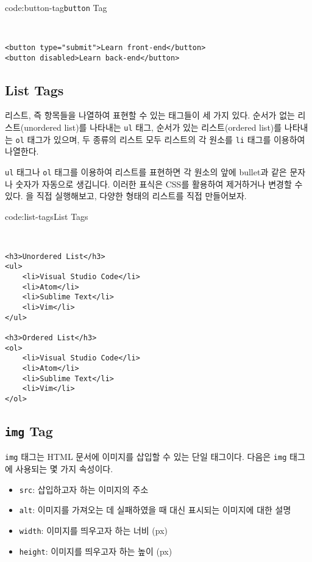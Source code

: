\begin{codeenv}{code:button-tag}{\texttt{button} Tag}\begin{verbatim}


<button type="submit">Learn front-end</button>
<button disabled>Learn back-end</button>
\end{verbatim}
\end{codeenv}

\subsection*{List Tags}
리스트, 즉 항목들을 나열하여 표현할 수 있는 태그들이 세 가지 있다. 순서가 없는 리스트(unordered list)를 나타내는 \verb|ul| 태그, 순서가 있는 리스트(ordered list)를 나타내는 \verb|ol| 태그가 있으며, 두 종류의 리스트 모두 리스트의 각 원소를 \verb|li| 태그를 이용하여 나열한다.

\verb|ul| 태그나 \verb|ol| 태그를 이용하여 리스트를 표현하면 각 원소의 앞에 bullet과 같은 문자나 숫자가 자동으로 생깁니다. 이러한 표식은 CSS를 활용하여 제거하거나 변경할 수 있다. 을 직접 실행해보고, 다양한 형태의 리스트를 직접 만들어보자.

\begin{codeenv}{code:list-tags}{List Tags}\begin{verbatim}


<h3>Unordered List</h3>
<ul>
    <li>Visual Studio Code</li>
    <li>Atom</li>
    <li>Sublime Text</li>
    <li>Vim</li>
</ul>

<h3>Ordered List</h3>
<ol>
    <li>Visual Studio Code</li>
    <li>Atom</li>
    <li>Sublime Text</li>
    <li>Vim</li>
</ol>
\end{verbatim}
\end{codeenv}

\subsection*{\texttt{img} Tag}
\verb|img| 태그는 HTML 문서에 이미지를 삽입할 수 있는 단일 태그이다. 다음은 \verb|img| 태그에 사용되는 몇 가지 속성이다.

\begin{itemize}
    \item \verb|src|: 삽입하고자 하는 이미지의 주소
    \item \verb|alt|: 이미지를 가져오는 데 실패하였을 때 대신 표시되는 이미지에 대한 설명
    \item \verb|width|: 이미지를 띄우고자 하는 너비 (px)
    \item \verb|height|: 이미지를 띄우고자 하는 높이 (px)
\end{itemize}

